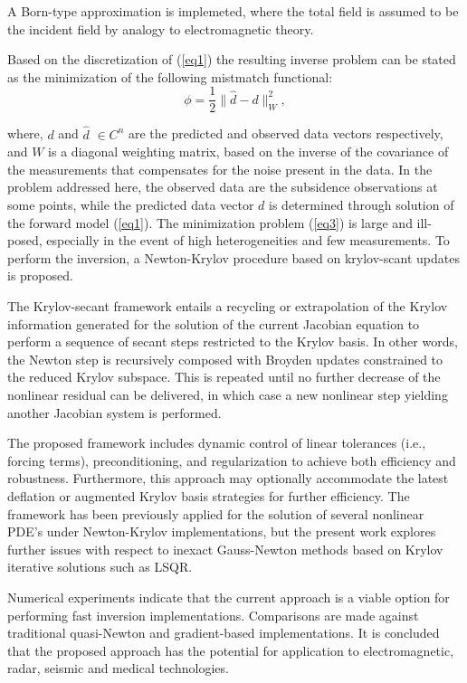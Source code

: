 \documentclass{report}
\begin{document}
A Born-type approximation is implemeted, where the total field is
assumed to be the incident field by analogy to electromagnetic
theory.

Based on the discretization of (\ref{eq1}) the resulting inverse
problem can be stated as the minimization of the following
mistmatch functional:
\begin{equation}
\phi =\frac{1}{2} \|\hat{d}-d\|_W^2, \label{eq3}
\end{equation}

where, $d$ and $\hat{d}$ $\in C^n$ are the predicted and observed
data vectors respectively, and $W$ is a diagonal weighting matrix,
based on the inverse of the covariance of the measurements that
compensates for the noise present in the data. In the problem
addressed here, the observed data are the subsidence observations
at some points, while the predicted data vector $d$ is determined
through solution of the forward model (\ref{eq1}). The
minimization problem (\ref{eq3}) is large and ill-posed,
especially in the event of high heterogeneities and few
measurements. To perform the inversion, a Newton-Krylov procedure
based on krylov-scant updates is proposed.

The Krylov-secant framework entails a recycling or extrapolation
of the Krylov information generated for the solution of the
current Jacobian equation to perform a sequence of secant steps
restricted to the Krylov basis. In other words, the Newton step is
recursively composed with Broyden updates constrained to the
reduced Krylov subspace. This is repeated until no further
decrease of the nonlinear residual can be delivered, in which case
a new nonlinear step yielding another Jacobian system is
performed.

The proposed framework includes dynamic control of linear
tolerances (i.e., forcing terms), preconditioning, and
regularization to achieve both efficiency and robustness.
Furthermore, this approach may optionally accommodate the latest
deflation or augmented Krylov basis strategies for further
efficiency. The framework has been previously applied for the
solution of several nonlinear PDE's under Newton-Krylov
implementations, but the present work explores further issues with
respect to inexact Gauss-Newton methods based on Krylov iterative
solutions such as LSQR.

Numerical experiments indicate that the current approach is a
viable option for performing fast inversion implementations.
Comparisons are made against traditional quasi-Newton and
gradient-based implementations. It is concluded that the proposed
approach has the potential for application to electromagnetic,
radar, seismic and medical technologies.
\end{document}
